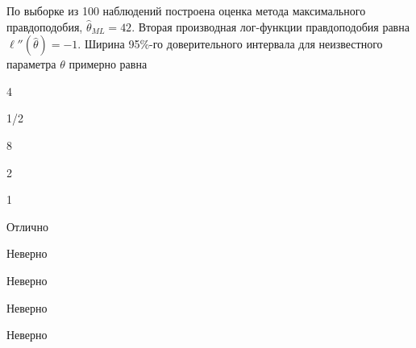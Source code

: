 
\begin{question}
По выборке из 100 наблюдений построена оценка метода максимального
правдоподобия, \(\hat \theta_{ML} = 42\). Вторая производная лог-функции
правдоподобия равна \(\ell''(\hat\theta) = -1\). Ширина 95\%-го
доверительного интервала для неизвестного параметра \(\theta\) примерно
равна
\begin{answerlist}
  \item 4
  \item 1/2
  \item 8
  \item 2
  \item 1
\end{answerlist}
\end{question}

\begin{solution}
\begin{answerlist}
  \item Отлично
  \item Неверно
  \item Неверно
  \item Неверно
  \item Неверно
\end{answerlist}
\end{solution}

